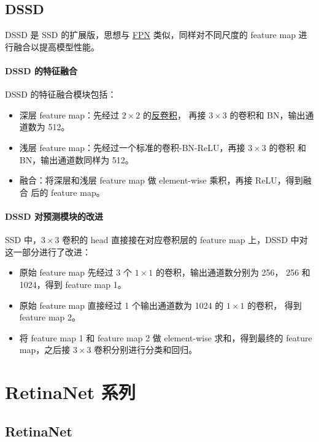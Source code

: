 \subsection{DSSD}
\label{subsec:DSSD}

DSSD 是 SSD 的扩展版，思想与 \hyperref[sec:FPN]{FPN} 类似，同样对不同尺度的
feature map 进行融合以提高模型性能。

\paragraph{DSSD 的特征融合}
DSSD 的特征融合模块包括：

\begin{itemize}
  \item 深层 feature map：先经过 $2 \times 2$ 的\hyperref[subsec:deconv]{反卷积}，
    再接 $3 \times 3$ 的卷积和 BN，输出通道数为 512。
  \item 浅层 feature map：先经过一个标准的卷积-BN-ReLU，再接 $3 \times 3$ 的卷积
    和 BN，输出通道数同样为 512。
  \item 融合：将深层和浅层 feature map 做 element-wise 乘积，再接 ReLU，得到融合
    后的 feature map。
\end{itemize}

\paragraph{DSSD 对预测模块的改进}
SSD 中，$3 \times 3$ 卷积的 head 直接接在对应卷积层的 feature map 上，DSSD 中对
这一部分进行了改进：

\begin{itemize}
  \item 原始 feature map 先经过 3 个 $1 \times 1$ 的卷积，输出通道数分别为 256，
    256 和 1024，得到 feature map 1。
  \item 原始 feature map 直接经过 1 个输出通道数为 1024 的 $1 \times 1$ 的卷积，
    得到 feature map 2。
  \item 将 feature map 1 和 feature map 2 做 element-wise 求和，得到最终的
    feature map，之后接 $3 \times 3$ 卷积分别进行分类和回归。
\end{itemize}

\section{RetinaNet 系列}

\subsection{RetinaNet}
\label{sub:RetinaNet}

